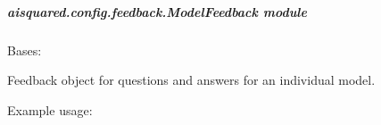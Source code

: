 \documentclass[letterpaper,10pt,english]{sphinxmanual}
\begin{document}
\subparagraph{aisquared.config.feedback.ModelFeedback module}
\label{\detokenize{aisquared.config.feedback:module-aisquared.config.feedback.ModelFeedback}}\label{\detokenize{aisquared.config.feedback:aisquared-config-feedback-modelfeedback-module}}

\begin{fulllineitems}
\label{\detokenize{aisquared.config.feedback:aisquared.config.feedback.ModelFeedback.ModelFeedback}}
\pysigstartsignatures
{}
\pysigstopsignatures
\sphinxAtStartPar
Bases: {\hyperref[\detokenize{aisquared.base:aisquared.base.BaseObject.BaseObject}]{}}

\sphinxAtStartPar
Feedback object for questions and answers for an individual model.

\sphinxAtStartPar
Example usage:


\end{fulllineitems}
\end{document}
